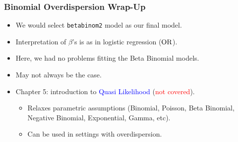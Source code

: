 \documentclass[oneside]{book}\usepackage[]{graphicx}\usepackage[svgnames]{xcolor}
\let\log\relax%
\newcommand{\OR}{\text{OR}}%
\begin{document}
\subsubsection*{Binomial Overdispersion Wrap-Up}
\begin{itemize}
    \item We would select \texttt{betabinom2} model as our final model.
    \item Interpretation of $ \beta $'s is as in logistic regression ($ \log{\OR} $).
    \item Here, we had no problems fitting the Beta Binomial models.
    \item May not always be the case.
    \item Chapter 5: introduction to \textcolor{Blue}{Quasi Likelihood} (\textcolor{Red}{not covered}).
          \begin{itemize}
              \item Relaxes parametric assumptions (Binomial, Poisson, Beta Binomial, Negative
                    Binomial, Exponential, Gamma, etc).
              \item Can be used in settings with overdispersion.
          \end{itemize}
\end{itemize}
\end{document}
